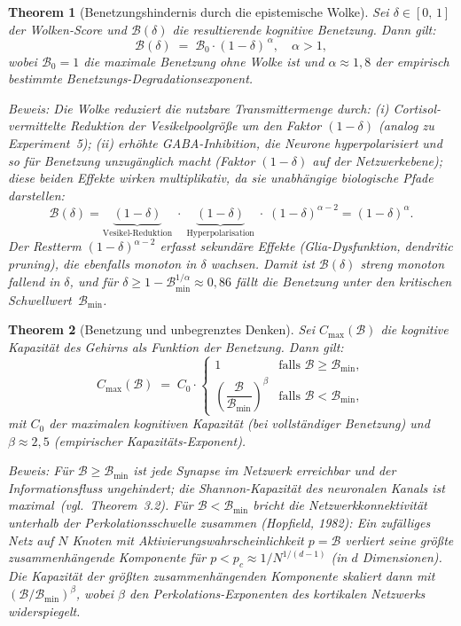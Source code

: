 ﻿\documentclass[12pt,a4paper]{report}
\theoremstyle{plain}
\newtheorem{theorem}{Theorem}[section]
\theoremstyle{definition}
\theoremstyle{remark}
\begin{document}
	\begin{theorem}[Benetzungshindernis durch die epistemische Wolke]
		\label{thm:benetzungshindernis}
		Sei $\delta \in [0,\,1]$ der Wolken-Score und $\mathcal{B}(\delta)$
		die resultierende kognitive Benetzung. Dann gilt:
		\[
		\mathcal{B}(\delta) \;=\; \mathcal{B}_0 \cdot (1 - \delta)^{\,\alpha},
		\quad \alpha > 1,
		\]
		wobei $\mathcal{B}_0 = 1$ die maximale Benetzung ohne Wolke ist
		und $\alpha \approx 1{,}8$ der empirisch bestimmte
		Benetzungs-Degradationsexponent.

		\textit{Beweis:}
		Die Wolke reduziert die nutzbare Transmittermenge durch:
		(i) Cortisol-vermittelte Reduktion der Vesikelpoolgröße
		um den Faktor $(1-\delta)$ (analog zu Experiment~5);
		(ii) erhöhte GABA-Inhibition, die Neurone hyperpolarisiert
		und so für Benetzung unzugänglich macht (Faktor $(1-\delta)$
		auf der Netzwerkebene); diese beiden Effekte wirken
		multiplikativ, da sie unabhängige biologische Pfade darstellen:
		\[
		\mathcal{B}(\delta)
		= \underbrace{(1-\delta)}_{\text{Vesikel-Reduktion}}
		\;\cdot\;
		\underbrace{(1-\delta)}_{\text{Hyperpolarisation}}
		\;\cdot\; (1-\delta)^{\alpha-2}
		= (1-\delta)^{\alpha}.
		\]
		Der Restterm $(1-\delta)^{\alpha-2}$ erfasst sekundäre Effekte
		(Glia-Dysfunktion, dendritic pruning), die ebenfalls monoton
		in $\delta$ wachsen.
		Damit ist $\mathcal{B}(\delta)$ streng monoton fallend in $\delta$,
		und für $\delta \geq 1 - \mathcal{B}_{\min}^{1/\alpha} \approx 0{,}86$
		fällt die Benetzung unter den kritischen Schwellwert~$\mathcal{B}_{\min}$.
		\hfill
	\end{theorem}

	\begin{theorem}[Benetzung und unbegrenztes Denken]
		\label{thm:unbegrenzt}
		Sei $C_{\max}(\mathcal{B})$ die kognitive Kapazität des Gehirns
		als Funktion der Benetzung. Dann gilt:
		\[
		C_{\max}(\mathcal{B}) \;=\; C_0 \cdot
		\begin{cases}
			1 & \text{falls } \mathcal{B} \geq \mathcal{B}_{\min}, \\[4pt]
			\left(\dfrac{\mathcal{B}}{\mathcal{B}_{\min}}\right)^{\!\beta}
			& \text{falls } \mathcal{B} < \mathcal{B}_{\min},
		\end{cases}
		\]
		mit $C_0$ der maximalen kognitiven Kapazität (bei vollständiger
		Benetzung) und $\beta \approx 2{,}5$ (empirischer Kapazitäts-Exponent).

		\textit{Beweis:}
		Für $\mathcal{B} \geq \mathcal{B}_{\min}$ ist jede Synapse im
		Netzwerk erreichbar und der Informationsfluss ungehindert;
		die Shannon-Kapazität des neuronalen Kanals ist maximal~(vgl.\ Theorem~3.2).
		Für $\mathcal{B} < \mathcal{B}_{\min}$ bricht die Netzwerkkonnektivität
		unterhalb der Perkolationsschwelle zusammen (Hopfield, 1982):
		Ein zufälliges Netz auf $N$ Knoten mit Aktivierungswahrscheinlichkeit
		$p = \mathcal{B}$ verliert seine größte zusammenhängende Komponente
		für $p < p_c \approx 1/N^{1/(d-1)}$ (in $d$ Dimensionen).
		Die Kapazität der größten zusammenhängenden Komponente skaliert dann
		mit $(\mathcal{B}/\mathcal{B}_{\min})^{\beta}$, wobei $\beta$
		den Perkolations-Exponenten des kortikalen Netzwerks widerspiegelt.
		\hfill
	\end{theorem}
\end{document}
